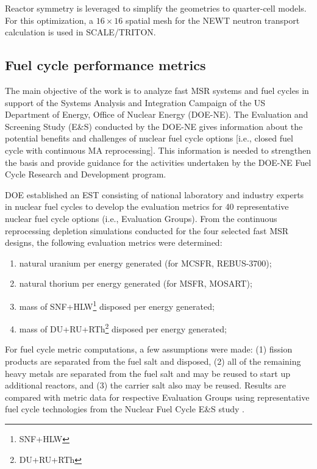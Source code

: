 \documentclass[letterpaper]{mandc2019}
\begin{document}
Reactor symmetry is leveraged to simplify the geometries to quarter-cell models. For this optimization, a $16\times 16$ spatial mesh for the NEWT neutron transport calculation is used in SCALE/TRITON.
\subsection{Fuel cycle performance metrics}
\label{sec:metrics}
The main objective of the work is to analyze fast \gls{MSR} systems and fuel cycles in support of the Systems Analysis and Integration Campaign of the US Department of Energy, Office of Nuclear Energy (DOE-NE). The Evaluation and Screening Study (E\&S) conducted by the DOE-NE gives information about the potential benefits and challenges of nuclear fuel cycle options [i.e., closed fuel cycle with continuous \gls{MA} reprocessing]. This information is needed to strengthen the basis and provide guidance for the activities undertaken by the DOE-NE Fuel Cycle Research and Development program.

DOE established an \gls{EST} consisting of national laboratory and industry experts in nuclear fuel cycles to develop the evaluation metrics for 40 representative nuclear fuel cycle options (i.e., Evaluation Groups). From the continuous reprocessing depletion simulations conducted for the four selected fast \gls{MSR} designs, the following evaluation metrics were determined:
\vspace{-0.4in}
\begin{enumerate}
	\item natural uranium per energy generated (for \gls{MCSFR}, REBUS-3700);\vspace{-0.11in}
	\item natural thorium per energy generated (for \gls{MSFR}, \gls{MOSART});\vspace{-0.11in}
	\item mass of SNF+HLW\footnote{\gls{SNF}+\gls{HLW}} disposed per energy generated;\vspace{-0.11in}
	\item mass of DU+RU+RTh\footnote{\gls{DU}+\gls{RU}+\gls{RTh}} disposed per energy  generated;\vspace{-0.18in}
\end{enumerate}
For fuel cycle metric computations, a few assumptions were made:
(1) fission products are separated from the fuel salt and disposed,
(2) all of the remaining heavy metals are separated from the fuel salt and may be reused to start up additional reactors, and
(3) the carrier salt also may be reused.
Results are compared with metric data for respective Evaluation Groups using representative fuel cycle technologies from the Nuclear Fuel Cycle E\&S study \cite{wigeland_nuclear_2014-4}.
\end{document}
